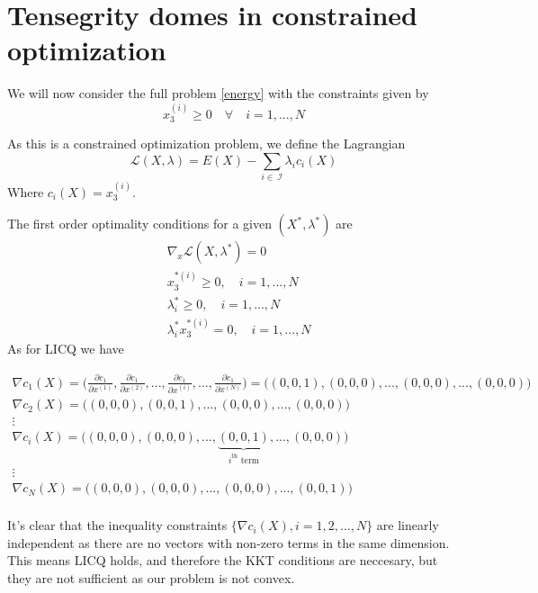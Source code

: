 \section{Tensegrity domes in constrained optimization}\label{sec:freestanding}
We will now consider the full problem \eqref{energy} with the constraints given by 
\begin{equation}
    x_3^{(i)} \geq 0 \quad \forall \quad i = 1,...,N \label{eq:aboveground}
\end{equation}

As this is a constrained optimization problem, we define the Lagrangian \begin{equation}
    \mathcal{L}(X,\lambda) = E(X) - \sum_{i \in \ \mathcal{I}}\lambda_i c_i(X)
\end{equation}
Where $c_i(X) = x^{(i)}_3$.

The first order optimality conditions for a given $(X^*,\lambda^*)$ are \begin{equation}
\begin{aligned}
       &\nabla_x \mathcal{L}(X,\lambda^*)=0\\ 
       &x^{*(i)}_3 \geq 0,\quad i = 1,...,N\\
       &\lambda_i^* \geq 0 ,\quad i = 1,...,N\\
       & \lambda_i^* x^{*(i)}_3 = 0,\quad i = 1,...,N
\end{aligned}
\end{equation}
As for LICQ we have 

\begin{align*}
    \nabla c_1(X) = \bigg( \frac{\partial c_1}{\partial x^{(1)}},\frac{\partial c_1}{\partial x^{(2)}},...,\frac{\partial c_1}{\partial x^{(i)}},...,\frac{\partial c_1}{\partial x^{(N)}} \bigg) =\bigg( (0,0,1),(0,0,0),...,(0,0,0),...,(0,0,0) \bigg) \\
    \nabla c_2(X) = \bigg( (0,0,0),(0,0,1),...,(0,0,0),...,(0,0,0) \bigg) \\
    \vdots 
    \hspace{200pt}\\
    \nabla c_i(X) = \bigg( (0,0,0),(0,0,0),...,\underbrace{(0,0,1)}_{i^{\text{th}}\text{ term}},...,(0,0,0) \bigg)\\
    \vdots
    \hspace{200pt}\\
    \nabla c_N(X) = \bigg( (0,0,0),(0,0,0),...,(0,0,0),...,(0,0,1) \bigg) \\
\end{align*}

It's clear that the inequality constraints $\{\nabla c_i(X),i=1,2,...,N\}$ are linearly independent as there are no vectors with non-zero terms in the same dimension. This means LICQ holds, and therefore the KKT conditions are neccesary, but they are not sufficient as our problem is not convex.